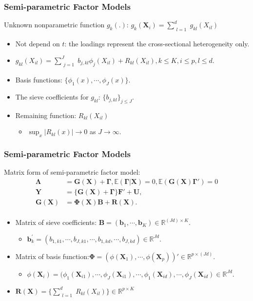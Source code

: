 \documentclass{beamer}
\newcommand{\E}{\mathbb E}
\newcommand{\R}{\mathbb R}
\newcommand{\bB}{\mathbf B}
\newcommand{\bF}{\mathbf F}
\newcommand{\bG}{\mathbf G}
\newcommand{\bR}{\mathbf R}
\newcommand{\bU}{\mathbf U}
\newcommand{\bX}{\mathbf X}
\newcommand{\bY}{\mathbf Y}
\newcommand{\bb}{\mathbf b}
\newcommand{\bLambda}{\boldsymbol{\Lambda}}
\newcommand{\bGamma}{\boldsymbol{\Gamma}}
\newcommand{\bPhi}{\boldsymbol{\Phi}}
\begin{document}

\begin{frame}
\frametitle{Semi-parametric Factor Models}
Unknown nonparametric function $g_k(.)$: $g_k(\bX_i) = \sum_{\substack{l = 1}}^{d} g_{kl}(X_{il})$
\begin{itemize}
	\item Not depend on $t$: the loadings represent the cross-sectional heterogeneity only.
	\item $g_{kl}(X_{il}) = \sum_{\substack{j = 1}}^{J}b_{j,kl}\phi_j(X_{il}) + R_{kl}(X_{il}), k \leq K, i \leq p, l \leq d.$
	\item Basis functions: $\{\phi_1(x), \cdots, \phi_J(x) \}$.
	\item The sieve coefficients for $g_{kl}$: $\{b_{j,kl}\}_{j \leq J}$.
	\item Remaining function: $R_{kl}(X_{il})$
	\begin{itemize}
		\item $\sup_x |R_{kl}(x)| \to 0$ as $J \to \infty.$
	\end{itemize}	
\end{itemize}	
\end{frame}




\begin{frame}
\frametitle{Semi-parametric Factor Models}
Matrix form of semi-parametric factor model:
\begin{equation}
	\label{eq:semiparafactormodel2}
	\begin{aligned}
	\bLambda &= \bG(\bX) + \bGamma, \E(\bGamma | \bX) = 0, \E(\bG(\bX) \bGamma') = 0\\
	\bY &= \{\bG(\bX) + \bGamma \} \bF' + \bU,\\
	\bG(\bX) &= \bPhi(\bX) \bB + \bR(\bX). \\
	\end{aligned}
\end{equation}
\begin{itemize}
	\item Matrix of sieve coefficients: $\bB = (\bb_1, \cdots, \bb_K) \in \R^{(Jd)\times K}$.
	\begin{itemize}
		\item $\bb_k^{'} = (b_{1,k1}, \cdots, b_{J,k1}, \cdots, b_{1,kd}, \cdots, b_{J, kd}) \in \R^{Jd}$.
	\end{itemize}
	\item Matrix of basis function:$\bPhi = (\phi(\bX_1), \cdots, \phi(\bX_p))' \in \R^{p\times (Jd)}$.
	\begin{itemize}
		\item $\phi(\bX_i) = (\phi_1(\bX_{i1}), \cdots, \phi_J(\bX_{i1}), \cdots, \phi_1(\bX_{id}), \cdots, \phi_J(\bX_{id}) \in \R^{Jd}$.
	\end{itemize}
	\item $\bR(\bX) = \{\sum_{\substack{l=1}}^{d}R_{kl}(X_{il})\} \in \R^{p \times K}$
\end{itemize}

\end{frame}
	
\end{document}
